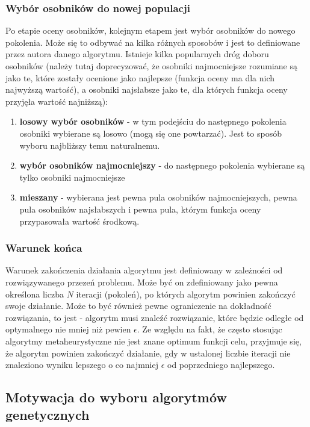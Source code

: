 \subsubsection{Wybór osobników do nowej populacji}
Po etapie oceny osobników, kolejnym etapem jest wybór osobników do nowego pokolenia. Może się to odbywać na kilka różnych sposobów i jest to definiowane przez autora danego algorytmu. Istnieje kilka popularnych dróg doboru osobników (należy tutaj doprecyzować, że osobniki najmocniejsze rozumiane są jako te, które zostały ocenione jako najlepsze (funkcja oceny ma dla nich najwyższą wartość), a osobniki najsłabsze jako te, dla których funkcja oceny przyjęła wartość najniższą):

\begin{enumerate}
    \item \textbf{losowy wybór osobników} - w tym podejściu do następnego pokolenia osobniki wybierane są losowo (mogą się one powtarzać). Jest to sposób wyboru najbliższy temu naturalnemu.
    \item \textbf{wybór osobników najmocniejszy} - do następnego pokolenia wybierane są tylko osobniki najmocniejsze
    \item \textbf{mieszany} - wybierana jest pewna pula osobników najmocniejszych, pewna pula osobników najsłabszych i pewna pula, którym funkcja oceny przypasowała wartość środkową.
\end{enumerate}

\subsubsection{Warunek końca}
Warunek zakończenia działania algorytmu jest definiowany w zależności od rozwiązywanego przezeń problemu. Może być on zdefiniowany jako pewna określona liczba $N$ iteracji (pokoleń), po których algorytm powinien zakończyć swoje działanie. Może to być również pewne ograniczenie na dokładność rozwiązania, to jest - algorytm musi znaleźć rozwiązanie, które będzie odległe od optymalnego nie mniej niż pewien $\epsilon$. Ze względu na fakt, że często stosując algorytmy metaheurystyczne nie jest znane optimum funkcji celu, przyjmuje się, że algorytm powinien zakończyć działanie, gdy w ustalonej liczbie iteracji nie znaleziono wyniku lepszego o co najmniej $\epsilon$ od poprzedniego najlepszego.

\subsection{Motywacja do wyboru algorytmów genetycznych}

